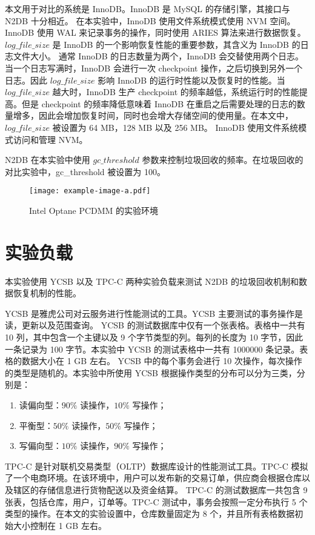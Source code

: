 本文用于对比的系统是 InnoDB。InnoDB 是 MySQL 的存储引擎，其接口与 N2DB 十分相近。
在本实验中，InnoDB 使用文件系统模式使用 NVM 空间。
InnoDB 使用 WAL 来记录事务的操作，同时使用 ARIES 算法来进行数据恢复。
$log\_file\_size$ 是 InnoDB 的一个影响恢复性能的重要参数，其含义为 InnoDB 的日志文件大小。
通常 InnoDB 的日志数量为两个，InnoDB 会交替使用两个日志。当一个日志写满时，InnoDB 会进行一次 checkpoint 操作，之后切换到另外一个日志。因此 $log\_file\_size$ 影响 InnoDB 的运行时性能以及恢复时的性能。当 $log\_file\_size$ 越大时，InnoDB 生产 checkpoint 的频率越低，系统运行时的性能提高。但是 checkpoint 的频率降低意味着 InnoDB 在重启之后需要处理的日志的数量增多，因此会增加恢复时间，同时也会增大存储空间的使用量。在本文中，$log\_file\_size$ 被设置为 64 MB，128 MB 以及 256 MB。
InnoDB 使用文件系统模式访问和管理 NVM。

N2DB 在本实验中使用 $gc\_threshold$ 参数来控制垃圾回收的频率。在垃圾回收的对比实验中，gc\_threshold 被设置为 100。

\begin{figure}
    \centering
    \texttt{[image: example-image-a.pdf]}
    \caption{Intel Optane PCDMM 的实验环境}
    \label{fig:config}
\end{figure}

\section{实验负载}

本实验使用 YCSB 以及 TPC-C 两种实验负载来测试 N2DB 的垃圾回收机制和数据恢复机制的性能。

YCSB 是雅虎公司对云服务进行性能测试的工具。YCSB 主要测试的事务操作是读，更新以及范围查询。
YCSB 的测试数据库中仅有一个张表格。表格中一共有 10 列，其中包含一个主键以及 9 个字节类型的列。每列的长度为 10 字节，因此一条记录为 100 字节。本实验中 YCSB 的测试表格中一共有 1000000 条记录。表格的数据大小在 1 GB 左右。
YCSB 中的每个事务会进行 10 次操作，每次操作的类型是随机的。本实验中所使用 YCSB 根据操作类型的分布可以分为三类，分别是：
\begin{enumerate}
    \item 读偏向型：$90\%$ 读操作，$10\%$ 写操作；
    \item 平衡型：$50\%$ 读操作，$50\%$ 写操作；
    \item 写偏向型：$10\%$ 读操作，$90\%$ 写操作；
\end{enumerate}


TPC-C 是针对联机交易类型（OLTP）数据库设计的性能测试工具。TPC-C 模拟了一个电商环境。在该环境中，用户可以发布新的交易订单，供应商会根据仓库以及辖区的存储信息进行货物配送以及资金结算。
TPC-C 的测试数据库一共包含 9 张表，包括仓库，用户，订单等。TPC-C 测试中，事务会按照一定分布执行 5 个类型的操作。在本文的实验设置中，仓库数量固定为 8 个，并且所有表格数据初始大小控制在 1 GB 左右。

